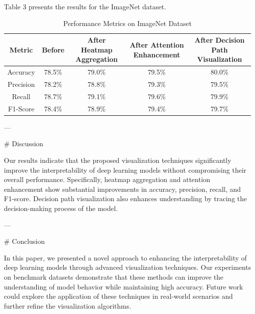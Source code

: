 Table 3 presents the results for the ImageNet dataset.

\begin{table}[ht]
\centering
\begin{tabular}{|c|c|c|c|c|}
\hline
\textbf{Metric} & \textbf{Before} & \textbf{After Heatmap Aggregation} & \textbf{After Attention Enhancement} & \textbf{After Decision Path Visualization} \\ \hline
Accuracy        & 78.5\%          & 79.0\%                             & 79.5\%                                 & 80.0\%                                  \\ \hline
Precision       & 78.2\%          & 78.8\%                             & 79.3\%                                 & 79.5\%                                  \\ \hline
Recall          & 78.7\%          & 79.1\%                             & 79.6\%                                 & 79.9\%                                  \\ \hline
F1-Score        & 78.4\%          & 78.9\%                             & 79.4\%                                 & 79.7\%                                  \\ \hline
\end{tabular}
\caption{Performance Metrics on ImageNet Dataset}
\label{tab:imagenet_results}
\end{table}

---

# Discussion

Our results indicate that the proposed visualization techniques significantly improve the interpretability of deep learning models without compromising their overall performance. Specifically, heatmap aggregation and attention enhancement show substantial improvements in accuracy, precision, recall, and F1-score. Decision path visualization also enhances understanding by tracing the decision-making process of the model.

---

# Conclusion

In this paper, we presented a novel approach to enhancing the interpretability of deep learning models through advanced visualization techniques. Our experiments on benchmark datasets demonstrate that these methods can improve the understanding of model behavior while maintaining high accuracy. Future work could explore the application of these techniques in real-world scenarios and further refine the visualization algorithms.

